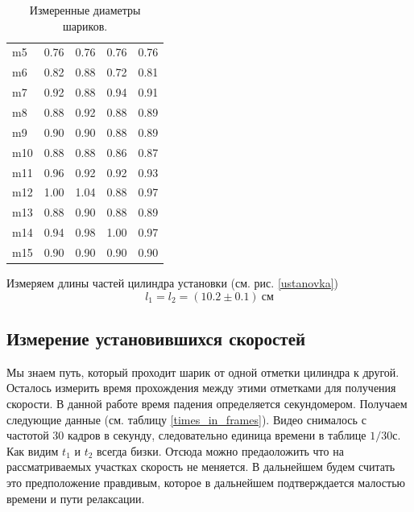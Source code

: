 \documentclass[a4paper, 12pt]{article}
\begin{document}
\begin{table}[h!]
\begin{center}
{\begin{tabular}{|l|rrr|r|}
                m5  & 0.76  & 0.76  & 0.76  & 0.76                \\
                m6  & 0.82  & 0.88  & 0.72  & 0.81                \\
                m7  & 0.92  & 0.88  & 0.94  & 0.91                \\
                m8  & 0.88  & 0.92  & 0.88  & 0.89                \\
                m9  & 0.90  & 0.90  & 0.88  & 0.89                \\
                m10 & 0.88  & 0.88  & 0.86  & 0.87                \\
                m11 & 0.96  & 0.92  & 0.92  & 0.93                \\
                m12 & 1.00  & 1.04  & 0.88  & 0.97                \\
                m13 & 0.88  & 0.90  & 0.88  & 0.89                \\
                m14 & 0.94  & 0.98  & 1.00  & 0.97                \\
                m15 & 0.90  & 0.90  & 0.90  & 0.90                \\
                \hline
            \end{tabular}
        }

        \caption{Измеренные диаметры шариков.}
        \label{diams}
    \end{center}
\end{table}

Измеряем длины частей цилиндра установки (см. рис. \ref{ustanovka})
\begin{equation*} l_1=l_2=(10.2\pm0.1)\ \text{см} \end{equation*}

\subsection{Измерение установившихся скоростей} Мы знаем путь, который проходит
шарик от одной отметки цилиндра к другой. Осталось измерить время прохождения
между этими отметками для получения скорости. В данной работе время падения
определяется секундомером. Получаем следующие данные (см.
таблицу \ref{times_in_frames}). Видео снималось с частотой 30 кадров в секунду,
следовательно единица времени в таблице $1/30 с$. Как видим $t_1$ и $t_2$ всегда
бизки. Отсюда можно предаоложить что на рассматриваемых участках скорость не
меняется. В дальнейшем будем считать это предположение правдивым, которое в
дальнейшем подтверждается малостью времени и пути релаксации.
\end{document}
